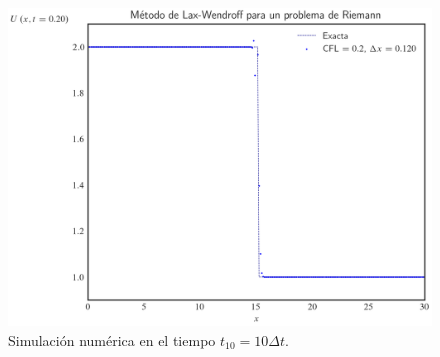 \begin{frame}
\begin{figure}[ht!]
        \includegraphics[width=.30\paperwidth]{../snapshots/lax-wendroffheaviside1d-10.png}
        \caption{Simulación numérica en el tiempo $t_{10}=10\Delta t$.}
        \label{fig:example2t10}
    \end{figure}
\end{frame}